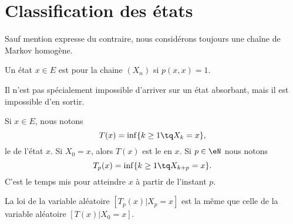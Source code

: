 \section{Classification des états}

Sauf mention expresse du contraire, nous considérons toujours une chaîne de Markov homogène.

\begin{definition}
    Un état \( x\in E\) est  pour la chaine \( (X_n)\) si \( p(x,x)=1\).
\end{definition}
Il n'est pas spécialement impossible d'arriver sur un état absorbant, mais il est impossible d'en sortir.

Si \( x\in E\), nous notons
\begin{equation}
    T(x)=\inf\{ k\geq 1\tq X_k=x \},
\end{equation}
le  de l'état \( x\). Si \( X_0=x\), alors \( T(x)\) est le  en \( x\). Si \( p\in \eN\) nous notons
\begin{equation}
    T_p(x)=\inf\{ k\geq 1\tq X_{k+p}=x \}.
\end{equation}
C'est le temps mis pour atteindre \( x\) à partir de l'instant \( p\).

\begin{proposition}
    La loi de la variable aléatoire \( [T_p(x)|X_p=x]\) est la même que celle de la variable aléatoire \( [T(x)|X_0=x]\).
\end{proposition}

